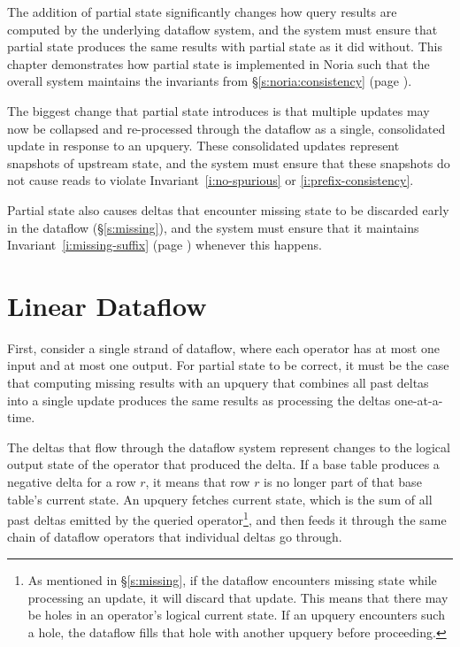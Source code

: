 The addition of partial state significantly changes how query results are
computed by the underlying dataflow system, and the system must ensure that
partial state produces the same results with partial state as it did without.
This chapter demonstrates how partial state is implemented in Noria such that
the overall system maintains the invariants from \S\ref{s:noria:consistency}
(page \pageref{i:no-spurious}).

The biggest change that partial state introduces is that multiple updates may
now be collapsed and re-processed through the dataflow as a single, consolidated
update in response to an upquery. These consolidated updates represent snapshots
of upstream state, and the system must ensure that these snapshots do not cause
reads to violate Invariant~\ref{i:no-spurious} or \ref{i:prefix-consistency}.

Partial state also causes deltas that encounter missing state to be discarded
early in the dataflow (\S\ref{s:missing}), and the system must ensure that it
maintains Invariant~\ref{i:missing-suffix} (page \pageref{i:missing-suffix})
whenever this happens.

\section{Linear Dataflow}

First, consider a single strand of dataflow, where each operator has at most one
input and at most one output. For partial state to be correct, it must be the
case that computing missing results with an upquery that combines all past
deltas into a single update produces the same results as processing the deltas
one-at-a-time.

The deltas that flow through the dataflow system represent changes to the
logical output state of the operator that produced the delta. If a base table
produces a negative delta for a row $r$, it means that row $r$ is no longer part
of that base table's current state. An upquery fetches current state, which is
the sum of all past deltas emitted by the queried operator\footnote{As mentioned
in \S\ref{s:missing}, if the dataflow encounters missing state while processing
an update, it will discard that update. This means that there may be holes in an
operator's logical current state. If an upquery encounters such a hole, the
dataflow fills that hole with another upquery before proceeding.}, and then
feeds it through the same chain of dataflow operators that individual deltas go
through.

